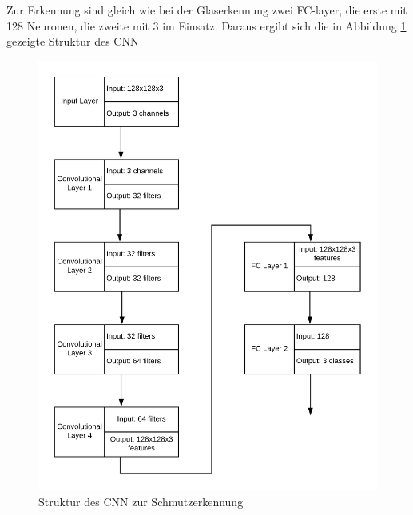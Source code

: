 Zur Erkennung sind gleich wie bei der Glaserkennung zwei FC-layer, die erste mit 128 Neuronen, die zweite mit 3 im Einsatz. Daraus ergibt sich die in Abbildung \ref{fig:table_structure} gezeigte Struktur des \ac{CNN}

\begin{figure}[!h]
	\centering
	\includegraphics[width=0.7\linewidth]{content/pictures/table_structure}
	\caption{Struktur des \ac{CNN} zur Schmutzerkennung}
	\label{fig:table_structure}
\end{figure}
